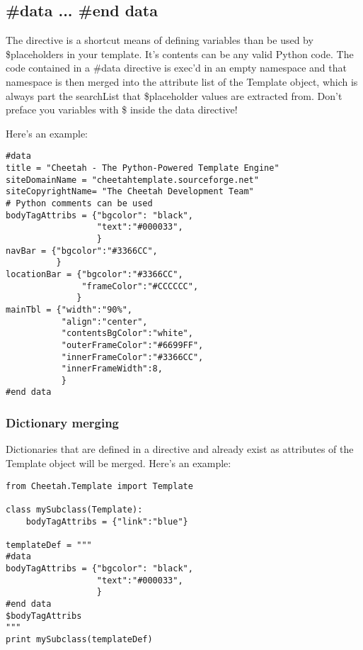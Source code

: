 \subsection{\#data ... \#end data}
\label{directives.data}

The  directive is a shortcut means of defining variables than be
used by \$placeholders in your template. It's contents can be any valid Python
code.  The code contained in a \#data directive is exec'd in an empty namespace
and that namespace is then merged into the attribute list of the Template
object, which is always part the searchList that \$placeholder values are
extracted from.  Don't preface you variables with \$ inside the data directive!

Here's an example:

\begin{verbatim}
#data
title = "Cheetah - The Python-Powered Template Engine"
siteDomainName = "cheetahtemplate.sourceforge.net"
siteCopyrightName= "The Cheetah Development Team" 
# Python comments can be used
bodyTagAttribs = {"bgcolor": "black",
                  "text":"#000033", 
                  }
navBar = {"bgcolor":"#3366CC", 
          }
locationBar = {"bgcolor":"#3366CC",
               "frameColor":"#CCCCCC",
              }
mainTbl = {"width":"90%",
           "align":"center",
           "contentsBgColor":"white",
           "outerFrameColor":"#6699FF", 
           "innerFrameColor":"#3366CC",
           "innerFrameWidth":8,
           }
#end data
\end{verbatim}

\subsubsection{Dictionary merging}

Dictionaries that are defined in a  directive and already exist as
attributes of the Template object will be merged.  Here's an example:

\begin{verbatim}
from Cheetah.Template import Template

class mySubclass(Template):
    bodyTagAttribs = {"link":"blue"}

templateDef = """
#data 
bodyTagAttribs = {"bgcolor": "black",
                  "text":"#000033", 
                  }
#end data
$bodyTagAttribs
"""
print mySubclass(templateDef)
\end{verbatim}

